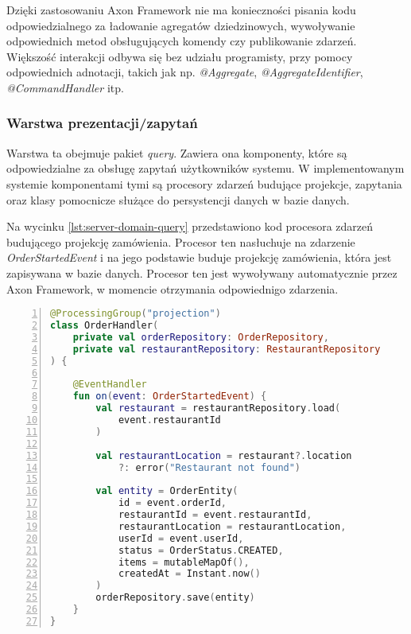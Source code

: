 Dzięki zastosowaniu Axon Framework nie ma konieczności pisania kodu odpowiedzialnego za ładowanie agregatów dziedzinowych, wywoływanie odpowiednich metod obsługujących komendy czy publikowanie zdarzeń. Większość interakcji odbywa się bez udziału programisty, przy pomocy odpowiednich adnotacji, takich jak np. \textit{@Aggregate}, \textit{@AggregateIdentifier}, \textit{@CommandHandler} itp.

\subsubsection{Warstwa prezentacji/zapytań}

Warstwa ta obejmuje pakiet \textit{query}. Zawiera ona komponenty, które są odpowiedzialne za obsługę zapytań użytkowników systemu. W implementowanym systemie komponentami tymi są procesory zdarzeń budujące projekcje, zapytania oraz klasy pomocnicze służące do persystencji danych w bazie danych.

Na wycinku \ref{lst:server-domain-query} przedstawiono kod procesora zdarzeń budującego projekcję zamówienia. Procesor ten nasłuchuje na zdarzenie \textit{OrderStartedEvent} i na jego podstawie buduje projekcję zamówienia, która jest zapisywana w bazie danych. Procesor ten jest wywoływany automatycznie przez Axon Framework, w momencie otrzymania odpowiednigo zdarzenia.

\begin{lstlisting}[caption={Kod procesora zdarzeń budującego projekcję zamówienia},label={lst:server-domain-query},captionpos=b,language=Kotlin,numbers=left,showstringspaces=false]
@ProcessingGroup("projection")
class OrderHandler(
    private val orderRepository: OrderRepository,
    private val restaurantRepository: RestaurantRepository
) {

    @EventHandler
    fun on(event: OrderStartedEvent) {
        val restaurant = restaurantRepository.load(
            event.restaurantId
        )

        val restaurantLocation = restaurant?.location 
            ?: error("Restaurant not found")

        val entity = OrderEntity(
            id = event.orderId,
            restaurantId = event.restaurantId,
            restaurantLocation = restaurantLocation,
            userId = event.userId,
            status = OrderStatus.CREATED,
            items = mutableMapOf(),
            createdAt = Instant.now()
        )
        orderRepository.save(entity)
    }
}
\end{lstlisting}

